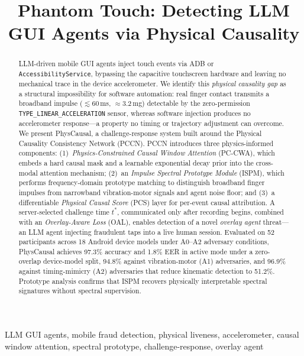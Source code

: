 \documentclass[10pt,journal,compsoc]{IEEEtran}
\begin{document}
\title{Phantom Touch: Detecting LLM GUI Agents via Physical Causality}

\author{
}

\maketitle

\begin{abstract}
LLM-driven mobile GUI agents inject touch events via ADB or \texttt{AccessibilityService},
bypassing the capacitive touchscreen hardware and leaving no mechanical trace in the device
accelerometer.
We identify this \textit{physical causality gap} as a structural impossibility for software
automation: real finger contact transmits a broadband impulse ($\lesssim$60\,ms, $\approx$3.2\,mg)
detectable by the zero-permission \texttt{TYPE\_LINEAR\_ACCELERATION} sensor, whereas software
injection produces no accelerometer response---a property no timing or trajectory
adjustment can overcome.
We present PhysCausal, a challenge-response system built around the Physical Causality
Consistency Network (PCCN).
PCCN introduces three physics-informed components: (1)~\textit{Physics-Constrained Causal
Window Attention} (PC-CWA), which embeds a hard causal mask and a learnable exponential
decay prior into the cross-modal attention mechanism; (2)~an \textit{Impulse Spectral
Prototype Module} (ISPM), which performs frequency-domain prototype matching to distinguish
broadband finger impulses from narrowband vibration-motor signals and agent noise floor;
and (3)~a differentiable \textit{Physical Causal Score} (PCS) layer for per-event causal
attribution.
A server-selected challenge time $t^*$, communicated only after recording begins, combined
with an \textit{Overlay-Aware Loss} (OAL), enables detection of a novel \textit{overlay
agent} threat---an LLM agent injecting fraudulent taps into a live human session.
Evaluated on 52 participants across 18 Android device models under A0--A2 adversary
conditions, PhysCausal achieves 97.3\% accuracy and 1.8\% EER in active mode under a
zero-overlap device-model split, 94.8\% against vibration-motor (A1) adversaries,
and 96.9\% against timing-mimicry (A2) adversaries that reduce kinematic detection to 51.2\%.
Prototype analysis confirms that ISPM recovers physically interpretable spectral
signatures without spectral supervision.
\end{abstract}

\begin{IEEEkeywords}
LLM GUI agents, mobile fraud detection, physical liveness, accelerometer, causal window
attention, spectral prototype, challenge-response, overlay agent
\end{IEEEkeywords}












\end{document}
